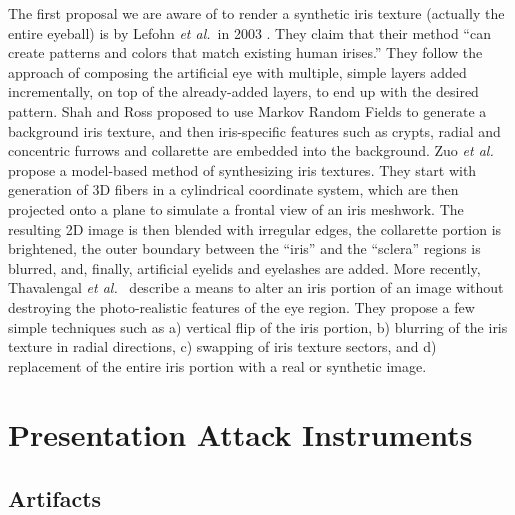 \documentclass[format=acmsmall, review=false, timestamp=false]{acmart}
\newcommand{\etal}{{\it et al.}~}
\begin{document}
The first proposal we are aware of to render a synthetic iris texture (actually the entire eyeball) is by Lefohn \etal in 2003 \cite{Lefohn_CGA_2003}. They claim that their method ``can create patterns and colors that match existing human irises.'' They  follow the approach of composing the artificial eye with multiple, simple layers added incrementally, on top of the already-added layers, to end up with the desired pattern. Shah and Ross \cite{Shah_ICIP_2006} proposed to use Markov Random Fields to generate a background iris texture, and then iris-specific features such as crypts, radial and concentric furrows and collarette are embedded into the background. Zuo \etal \cite{Zuo_TIFS_2007} propose a model-based method of synthesizing iris textures. They start with generation of 3D fibers in {a} cylindrical coordinate system, which are then projected onto a plane to simulate a frontal view of an iris meshwork. The resulting 2D image is then blended with irregular edges, the collarette portion is brightened, the outer boundary between the ``iris'' and the ``sclera'' regions is blurred, and, finally, artificial eyelids and eyelashes are added. More recently, Thavalengal \etal \cite{Thavalengal_IJCB_2014} describe a means to alter an iris portion of a{n} {image} without destroying the photo-realistic features of the eye region. They propose a few simple techniques such as a) vertical flip of the iris portion, b) blurring of the iris texture in radial directions, c) swapping of iris texture sectors, and d) replacement of the entire iris portion with a real or synthetic image.


\section{Presentation Attack Instruments}
\label{sec:PAI} 

\subsection{Artifacts}
\label{sec:KnownVulnerabilities_Artifacts}
\end{document}

